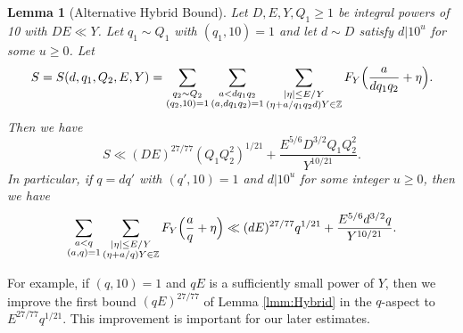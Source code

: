 \documentclass[10pt]{amsart}
\theoremstyle{plain}
\newtheorem{lmm}[thrm]{Lemma}
\numberwithin{sblmm}{thrm}
\numberwithin{equation}{section}
\begin{document}
%
%
%
%
\begin{lmm}[Alternative Hybrid Bound] \label{lmm:Hybrid2}
%
Let $D,E,Y,Q_1\ge 1$ be integral powers of 10 with $DE\ll Y$. Let $q_1\sim Q_1$ with $(q_1,10)=1$ and let $d\sim D$ satisfy $d|10^u$ for some $u\ge 0$. Let
\[
S=S(d,q_1,Q_2,E,Y)=\sum_{\substack{q_2\sim  Q_2\\ (q_2,10)=1}}\sum_{\substack{a< d q_1q_2\\ (a,d q_1q_2)=1}}\sum_{\substack{|\eta|\le E/Y\\ (\eta+a/q_1q_2d)Y\in\mathbb{Z}}}F_Y\Bigl(\frac{a}{d q_1q_2}+\eta\Bigr).
\]
Then we have
\[
S\ll (D E)^{27/77}(Q_1Q_2^2)^{1/21}+\frac{E^{5/6}D^{3/2}Q_1Q_2^2}{Y^{10/21}}.
\]
In particular, if  $q=d q'$ with $(q',10)=1$ and $d|10^u$ for some integer $u\ge 0$, then we have
\[
\sum_{\substack{a< q\\ (a,q)=1}}\sum_{\substack{|\eta|\le E/Y\\ (\eta+a/q)Y\in\mathbb{Z}}}F_Y\Bigl(\frac{a}{q}+\eta\Bigr)\ll (d E)^{27/77}q^{1/21}+\frac{E^{5/6} d^{3/2} q}{Y^{10/21}}.
\]
%
\end{lmm}
%
%
%
%
For example, if $(q,10)=1$ and $q E$ is a sufficiently small power of $Y$, then we improve the first bound $(q E)^{27/77}$ of Lemma \ref{lmm:Hybrid} in the $q$-aspect to $E^{27/77}q^{1/21}$. This improvement is important for our later estimates.
%
%
%
%
\end{document}
